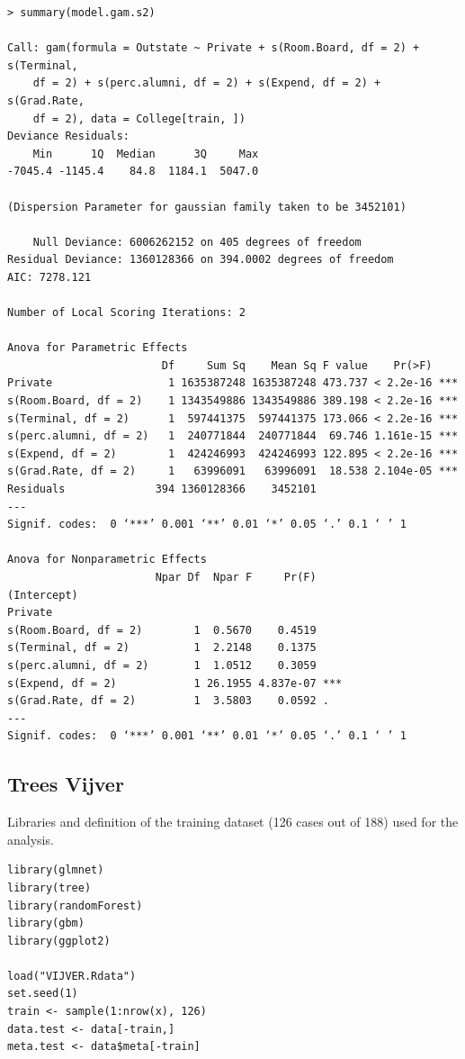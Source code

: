 \documentclass[11pt, a4paper]{article}
\begin{document}
\begin{verbatim}
> summary(model.gam.s2)

Call: gam(formula = Outstate ~ Private + s(Room.Board, df = 2) + s(Terminal, 
    df = 2) + s(perc.alumni, df = 2) + s(Expend, df = 2) + s(Grad.Rate, 
    df = 2), data = College[train, ])
Deviance Residuals:
    Min      1Q  Median      3Q     Max 
-7045.4 -1145.4    84.8  1184.1  5047.0 

(Dispersion Parameter for gaussian family taken to be 3452101)

    Null Deviance: 6006262152 on 405 degrees of freedom
Residual Deviance: 1360128366 on 394.0002 degrees of freedom
AIC: 7278.121 

Number of Local Scoring Iterations: 2 

Anova for Parametric Effects
                        Df     Sum Sq    Mean Sq F value    Pr(>F)    
Private                  1 1635387248 1635387248 473.737 < 2.2e-16 ***
s(Room.Board, df = 2)    1 1343549886 1343549886 389.198 < 2.2e-16 ***
s(Terminal, df = 2)      1  597441375  597441375 173.066 < 2.2e-16 ***
s(perc.alumni, df = 2)   1  240771844  240771844  69.746 1.161e-15 ***
s(Expend, df = 2)        1  424246993  424246993 122.895 < 2.2e-16 ***
s(Grad.Rate, df = 2)     1   63996091   63996091  18.538 2.104e-05 ***
Residuals              394 1360128366    3452101                      
---
Signif. codes:  0 ‘***’ 0.001 ‘**’ 0.01 ‘*’ 0.05 ‘.’ 0.1 ‘ ’ 1

Anova for Nonparametric Effects
                       Npar Df  Npar F     Pr(F)    
(Intercept)                                         
Private                                             
s(Room.Board, df = 2)        1  0.5670    0.4519    
s(Terminal, df = 2)          1  2.2148    0.1375    
s(perc.alumni, df = 2)       1  1.0512    0.3059    
s(Expend, df = 2)            1 26.1955 4.837e-07 ***
s(Grad.Rate, df = 2)         1  3.5803    0.0592 .  
---
Signif. codes:  0 ‘***’ 0.001 ‘**’ 0.01 ‘*’ 0.05 ‘.’ 0.1 ‘ ’ 1
\end{verbatim}
\subsection{Trees Vijver}
\label{sec-1-2}

Libraries and definition of the training dataset (126 cases out
of 188) used for the analysis.


\begin{verbatim}
library(glmnet)
library(tree)
library(randomForest)
library(gbm)
library(ggplot2)

load("VIJVER.Rdata")
set.seed(1)
train <- sample(1:nrow(x), 126)
data.test <- data[-train,]
meta.test <- data$meta[-train]
\end{verbatim}
\end{document}
